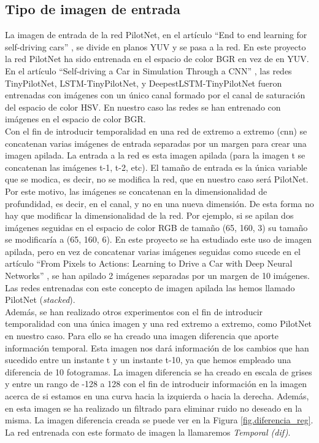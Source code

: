 \subsection{Tipo de imagen de entrada}

La imagen de entrada de la red PilotNet, en el artículo ``End to end learning for self-driving cars'' \cite{end2end}, se divide en planos YUV y se pasa a la red. En este proyecto la red PilotNet ha sido entrenada en el espacio de color BGR en vez de en YUV.\\

En el artículo ``Self-driving a Car in Simulation Through a CNN'' \cite{self-driving}, las redes TinyPilotNet, LSTM-TinyPilotNet, y DeepestLSTM-TinyPilotNet fueron entrenadas con imágenes con un único canal formado por el canal de saturación del espacio de color HSV. En nuestro caso las redes se han entrenado con imágenes en el espacio de color BGR.\\

Con el fin de introducir temporalidad en una red de extremo a extremo (\acrshort{cnn}) se concatenan varias imágenes de entrada separadas por un margen para crear una imagen apilada. La entrada a la red es esta imagen apilada (para la imagen t se concatenan las imágenes t-1, t-2, etc). El tamaño de entrada es la única variable que se modica, es decir, no se modifica la red, que en nuestro caso será PilotNet. Por este motivo, las imágenes se concatenan en la dimensionalidad de profundidad, es decir, en el canal, y no en una nueva dimensión. De esta forma no hay que modificar la dimensionalidad de la red. Por ejemplo, si se apilan dos imágenes seguidas en el espacio de color RGB de tamaño (65, 160, 3) su tamaño se modificaría a (65, 160, 6). En este proyecto se ha estudiado este uso de imagen apilada, pero en vez de concatenar varias imágenes seguidas como sucede en el artículo ``From Pixels to Actions: Learning to Drive a Car with Deep Neural Networks'' \cite{pixels}, se han apilado 2 imágenes separadas por un margen de 10 imágenes. Las redes entrenadas con este concepto de imagen apilada las hemos llamado PilotNet (\textit{stacked}).\\

Además, se han realizado otros experimentos con el fin de introducir temporalidad con una única imagen y una red extremo a extremo, como PilotNet en nuestro caso. Para ello se ha creado una imagen diferencia que aporte información temporal. Esta imagen nos dará información de los cambios que han sucedido entre un instante t y un instante t-10, ya que hemos empleado una diferencia de 10 fotogramas. La imagen diferencia se ha creado en escala de grises y entre un rango de -128 a 128 con el fin de introducir información en la imagen acerca de si estamos en una curva hacia la izquierda o hacia la derecha. Además, en esta imagen se ha realizado un filtrado para eliminar ruido no deseado en la misma. La imagen diferencia creada se puede ver en la Figura \ref{fig.diferencia_reg}. La red entrenada con este formato de imagen la llamaremos \textit{Temporal (dif)}.\\

